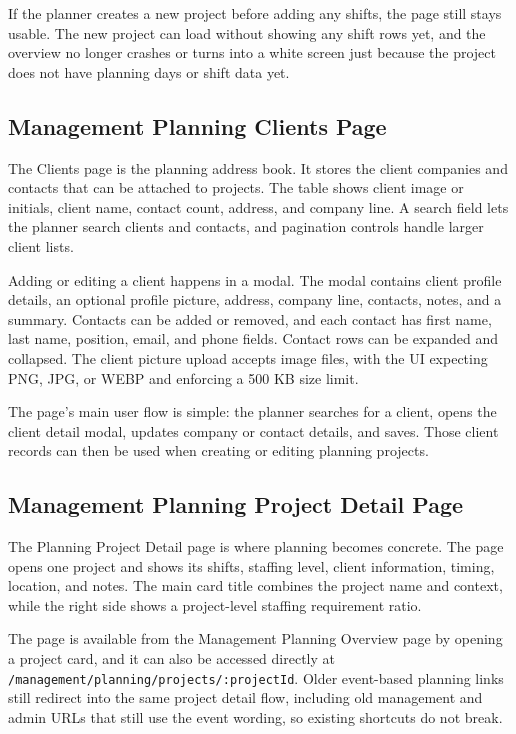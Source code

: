 \documentclass[11pt]{article}
\newcommand{\code}[1]{\nolinkurl{#1}}
\begin{document}
If the planner creates a new project before adding any shifts, the page still stays usable. The new project can load without showing any shift rows yet, and the overview no longer crashes or turns into a white screen just because the project does not have planning days or shift data yet.

\subsection{Management Planning Clients Page}

The Clients page is the planning address book. It stores the client companies and contacts that can be attached to projects. The table shows client image or initials, client name, contact count, address, and company line. A search field lets the planner search clients and contacts, and pagination controls handle larger client lists.

Adding or editing a client happens in a modal. The modal contains client profile details, an optional profile picture, address, company line, contacts, notes, and a summary. Contacts can be added or removed, and each contact has first name, last name, position, email, and phone fields. Contact rows can be expanded and collapsed. The client picture upload accepts image files, with the UI expecting PNG, JPG, or WEBP and enforcing a 500 KB size limit.

The page's main user flow is simple: the planner searches for a client, opens the client detail modal, updates company or contact details, and saves. Those client records can then be used when creating or editing planning projects.

\subsection{Management Planning Project Detail Page}

The Planning Project Detail page is where planning becomes concrete. The page opens one project and shows its shifts, staffing level, client information, timing, location, and notes. The main card title combines the project name and context, while the right side shows a project-level staffing requirement ratio.

The page is available from the Management Planning Overview page by opening a project card, and it can also be accessed directly at \code{/management/planning/projects/:projectId}. Older event-based planning links still redirect into the same project detail flow, including old management and admin URLs that still use the event wording, so existing shortcuts do not break.
\end{document}
